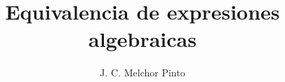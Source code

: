 \documentclass[12pt]{guia}
\title{Equivalencia de expresiones algebraicas}
\author{J. C. Melchor Pinto}
\begin{document}
\pagestyle{headandfoot}
\addpoints
\INFO
\printanswers
\begin{questions}
    
    
    
    \begin{multicols}{2}
        
    \end{multicols}
    \newpage
    
\end{questions}

\end{document}
